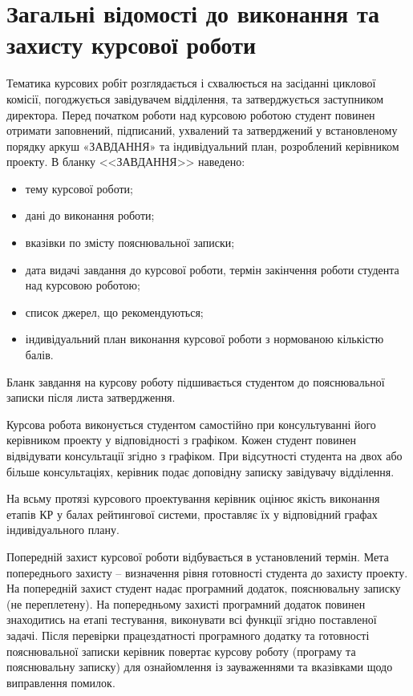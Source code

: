 \chapter{Загальні відомості до виконання та захисту курсової роботи}
Тематика курсових робіт розглядається і схвалюється на засіданні циклової комісії, погоджується  завідувачем відділення, та затверджується заступником директора.
Перед початком роботи над курсовою роботою студент повинен отримати заповнений, підписаний, ухвалений та затверджений у встановленому порядку аркуш «ЗАВДАННЯ» та індивідуальний план, розроблений керівником проекту. В бланку <<ЗАВДАННЯ>> наведено:
\begin{itemize}
\item тему курсової роботи;
\item дані до виконання роботи;
\item вказівки по змісту пояснювальної записки;
\item дата видачі завдання до курсової роботи, термін закінчення роботи студента над курсовою роботою;
\item список джерел, що рекомендуються;
\item індивідуальний план виконання курсової роботи з нормованою кількістю балів.
\end{itemize}

Бланк завдання на курсову роботу підшивається студентом до пояснювальної записки після листа затвердження.

Курсова робота виконується студентом самостійно при консультуванні його керівником проекту у відповідності з графіком. Кожен студент повинен відвідувати консультації згідно з графіком. При відсутності студента на двох або більше консультаціях, керівник подає доповідну записку завідувачу відділення.

На всьму протязі курсового проектування керівник оцінює якість виконання етапів КР у балах рейтингової системи, проставляє їх у відповідний графах індивідуального плану.

Попередній захист курсової роботи відбувається в установлений термін. Мета попереднього захисту – визначення рівня готовності студента до захисту проекту. На попередній захист студент надає програмний додаток, пояснювальну записку (не переплетену). На попередньому захисті програмний додаток повинен знаходитись на етапі тестування, виконувати всі функції згідно поставленої задачі.
Після перевірки працездатності програмного додатку та готовності пояснювальної записки керівник повертає курсову роботу (програму та пояснювальну записку) для ознайомлення із зауваженнями та вказівками щодо виправлення помилок.

